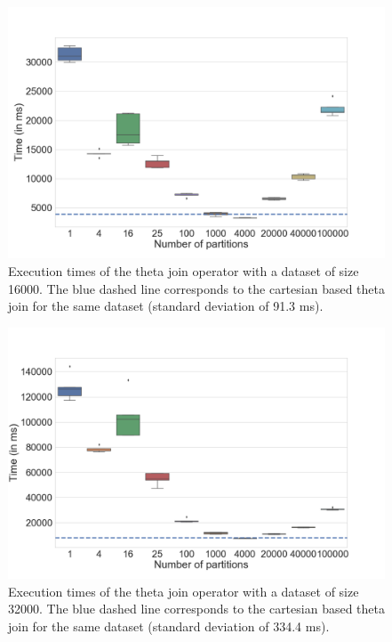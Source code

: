 \documentclass[a4paper,10pt]{IEEEtran}
\begin{document}
\begin{figure}[!ht]
    \centering
    \includegraphics[width=\linewidth]{"theta_16000.png"}
    \caption{Execution times of the theta join operator with a dataset of size 16000. The blue dashed line corresponds to the cartesian based theta join for the same dataset (standard deviation of 91.3 ms).}
    \label{fig:theta-16000}
\end{figure}

\begin{figure}[!ht]
    \centering
    \includegraphics[width=\linewidth]{"theta_32000.png"}
    \caption{Execution times of the theta join operator with a dataset of size 32000. The blue dashed line corresponds to the cartesian based theta join for the same dataset (standard deviation of 334.4 ms).}
    \label{fig:theta-32000}
\end{figure}

\clearpage
\end{document}
